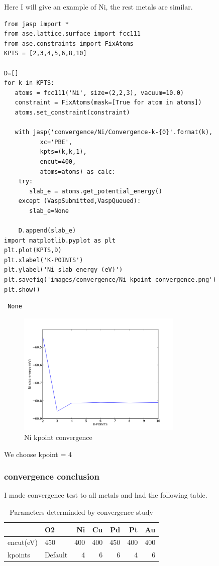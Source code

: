 \documentclass[11pt]{article}
\begin{document}
Here I will give an example of Ni, the rest metals are similar.

\begin{verbatim}
from jasp import *
from ase.lattice.surface import fcc111
from ase.constraints import FixAtoms
KPTS = [2,3,4,5,6,8,10]

D=[]
for k in KPTS:
   atoms = fcc111('Ni', size=(2,2,3), vacuum=10.0)
   constraint = FixAtoms(mask=[True for atom in atoms])
   atoms.set_constraint(constraint)

   with jasp('convergence/Ni/Convergence-k-{0}'.format(k),
          xc='PBE',
          kpts=(k,k,1),
          encut=400,
          atoms=atoms) as calc:
    try:
       slab_e = atoms.get_potential_energy()
    except (VaspSubmitted,VaspQueued):
       slab_e=None

    D.append(slab_e)
import matplotlib.pyplot as plt
plt.plot(KPTS,D)
plt.xlabel('K-POINTS')
plt.ylabel('Ni slab energy (eV)')
plt.savefig('images/convergence/Ni_kpoint_convergence.png')
plt.show()
\end{verbatim}

\begin{verbatim}
 None
\end{verbatim}
\begin{figure}[H]
\centering
\includegraphics[width=0.7\textwidth]{./images/convergence/Ni_kpoint_convergence.png}
\caption{Ni kpoint convergence}
\end{figure}

We choose kpoint = 4
\subsubsection{convergence conclusion}
\label{sec-3-2-3}

I made convergence test to all metals and had the following table.
\begin{table}[H]
\caption{Parameters determinded by convergence study}
\begin{center}
\begin{tabular}{llrrrrr}
            &  O2       &   Ni  &   Cu  &   Pd  &   Pt  &   Au  \\
\hline
 encut(eV)  &  450      &  400  &  400  &  450  &  400  &  400  \\
 kpoints    &  Default  &    4  &    6  &    6  &    4  &    6  \\
\end{tabular}
\end{center}
\end{table}
\end{document}

